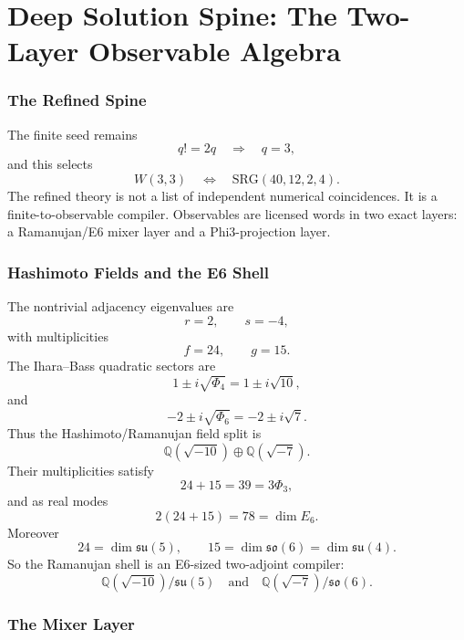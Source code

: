 %
%

\part{Deep Solution Spine: The Two-Layer Observable Algebra}
\label{part:deep-solution-spine}

\section{The Refined Spine}
\label{sec:refined-spine}

The finite seed remains
\[
q! = 2q \quad\Longrightarrow\quad q=3,
\]
and this selects
\[
W(3,3) \quad\Longleftrightarrow\quad \mathrm{SRG}(40,12,2,4).
\]
The refined theory is not a list of independent numerical coincidences.
It is a finite-to-observable compiler.  Observables are licensed words in
two exact layers: a Ramanujan/E6 mixer layer and a Phi3-projection layer.

\section{Hashimoto Fields and the E6 Shell}
\label{sec:hashimoto-fields-e6-shell-insert}

The nontrivial adjacency eigenvalues are
\[
r=2, \qquad s=-4,
\]
with multiplicities
\[
f=24, \qquad g=15.
\]
The Ihara--Bass quadratic sectors are
\[
1\pm i\sqrt{\Phi_4}=1\pm i\sqrt{10},
\]
and
\[
-2\pm i\sqrt{\Phi_6}=-2\pm i\sqrt7.
\]
Thus the Hashimoto/Ramanujan field split is
\[
\mathbb Q(\sqrt{-10})\oplus\mathbb Q(\sqrt{-7}).
\]
Their multiplicities satisfy
\[
24+15=39=3\Phi_3,
\]
and as real modes
\[
2(24+15)=78=\dim E_6.
\]
Moreover
\[
24=\dim \mathfrak{su}(5),
\qquad
15=\dim \mathfrak{so}(6)=\dim \mathfrak{su}(4).
\]
So the Ramanujan shell is an E6-sized two-adjoint compiler:
\[
\mathbb Q(\sqrt{-10})/\mathfrak{su}(5)
\quad\text{and}\quad
\mathbb Q(\sqrt{-7})/\mathfrak{so}(6).
\]

\section{The Mixer Layer}
\label{sec:mixer-layer-insert}

